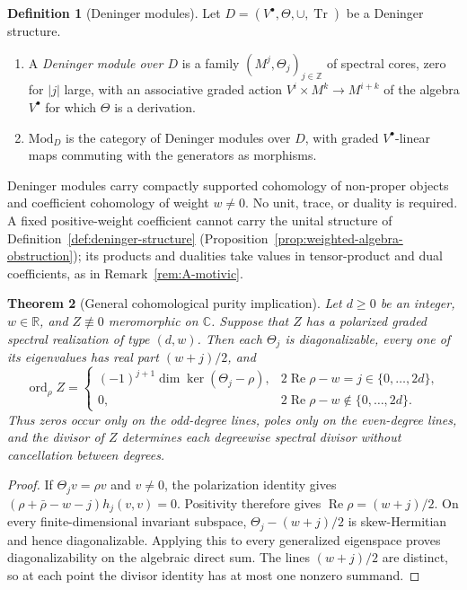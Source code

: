 \documentclass[11pt]{amsart}
\theoremstyle{plain}
\newtheorem{theorem}{Theorem}[section]
\theoremstyle{definition}
\newtheorem{definition}[theorem]{Definition}
\theoremstyle{remark}
\numberwithin{equation}{section}
\newcommand{\C}{\mathbb{C}}
\newcommand{\R}{\mathbb{R}}
\newcommand{\Z}{\mathbb{Z}}
\newcommand{\Mods}[1]{\mathrm{Mod}_{#1}}
\DeclareMathOperator{\Tr}{Tr}
\DeclareMathOperator{\Rea}{Re}
\DeclareMathOperator{\ord}{ord}
\renewcommand{\Re}{\Rea}
\begin{document}
\begin{definition}[Deninger modules]\label{def:deninger-module}
Let $D=(V^\bullet,\Theta,\cup,\Tr)$ be a Deninger structure.
\begin{enumerate}[label=(\alph*)]
\item A \emph{Deninger module over $D$} is a family
  $(M^j,\Theta_j)_{j\in\Z}$ of spectral cores, zero for $|j|$ large,
  with an associative graded action $V^i\times M^k\to M^{i+k}$ of the
  algebra $V^\bullet$ for which $\Theta$ is a derivation.
\item $\Mods D$ is the category of Deninger modules over $D$, with
  graded $V^\bullet$-linear maps commuting with the generators as
  morphisms.
\end{enumerate}
\end{definition}

Deninger modules carry compactly supported cohomology of non-proper
objects and coefficient cohomology of weight $w\ne0$. No unit, trace,
or duality is required. A fixed positive-weight coefficient cannot
carry the unital structure of Definition~\ref{def:deninger-structure}
(Proposition~\ref{prop:weighted-algebra-obstruction}); its products
and dualities take values in tensor-product and dual coefficients, as
in Remark~\ref{rem:A-motivic}.

\begin{theorem}[General cohomological purity implication]

\label{thm:main-general}
Let $d\ge0$ be an integer, $w\in\R$, and $Z\not\equiv0$ meromorphic
on $\C$. Suppose that $Z$ has a polarized graded spectral realization
of type $(d,w)$. Then each $\Theta_j$ is diagonalizable, every one of
its eigenvalues has real part $(w+j)/2$, and
\[
 \ord_\rho Z=
 \begin{cases}
 (-1)^{j+1}\dim\ker(\Theta_j-\rho),
       &2\Re\rho-w=j\in\{0,\ldots,2d\},\\
 0,    &2\Re\rho-w\notin\{0,\ldots,2d\}.
 \end{cases}
\]
Thus zeros occur only on the odd-degree lines, poles only on the
even-degree lines, and the divisor of $Z$ determines each degreewise
spectral divisor without cancellation between degrees.
\end{theorem}

\begin{proof}
If $\Theta_jv=\rho v$ and $v\ne0$, the polarization identity gives
$(\rho+\bar\rho-w-j)h_j(v,v)=0$. Positivity therefore gives
$\Re\rho=(w+j)/2$. On every finite-dimensional invariant subspace,
$\Theta_j-(w+j)/2$ is skew-Hermitian and hence diagonalizable.
Applying this to every generalized eigenspace proves diagonalizability
on the algebraic direct sum. The lines $(w+j)/2$ are distinct, so at
each point the divisor identity has at most one nonzero summand.
\end{proof}
\end{document}
